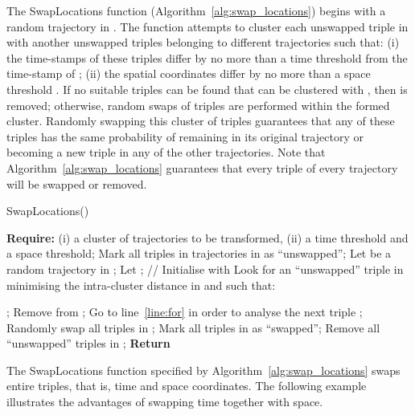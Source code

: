 The SwapLocations function (Algorithm~\ref{alg:swap_locations})
begins with a random trajectory  in .
The function attempts to cluster
each unswapped triple  in 
with another 
unswapped triples belonging to different trajectories
such that: (i) the time-stamps of these triples differ by
no more than a time threshold  from the time-stamp of ;
(ii) the spatial coordinates differ by
no more than a space threshold .
If no  suitable
triples can be found that can be clustered with ,
then  is removed; otherwise,
random swaps of triples
are performed within the formed cluster.
Randomly swapping this cluster of triples guarantees that any of these triples
has the same probability of remaining in its original trajectory or becoming
a new triple in any of the other  trajectories.
Note that Algorithm~\ref{alg:swap_locations} guarantees that every triple  of every trajectory 
will be swapped or removed.




\begin{algorithm}[!ht]
\caption{SwapLocations()} \label{alg:swap_locations}
\begin{algorithmic}[1]
\STATE \textbf{Require:} (i)  a cluster of trajectories to be transformed, (ii)  a time threshold and  a space threshold;
\STATE Mark all triples in trajectories in  as ``unswapped'';
\STATE Let  be a random trajectory in ; \label{line:fewest}
 \label{line:for}
    \STATE Let ;
// Initialise  with 
        \STATE Look for an ``unswapped''
	triple 
	in  minimising the intra-cluster distance in  and such that:
        
        
            \STATE ;
        \ELSE
        	\STATE Remove  from ;
          \STATE Go to line~\ref{line:for} in order to analyse the next triple
	  ;
        \ENDIF
    \ENDFOR
\STATE Randomly swap all triples in ;
    \STATE Mark all triples in  as ``swapped'';
\ENDFOR
\STATE Remove all ``unswapped'' triples in ;
\STATE \textbf{Return}  
\end{algorithmic}
\end{algorithm}

The SwapLocations function specified by
Algorithm~\ref{alg:swap_locations} swaps entire triples, that is,
time and space coordinates.
The following example illustrates the advantages of swapping
time together with space.

